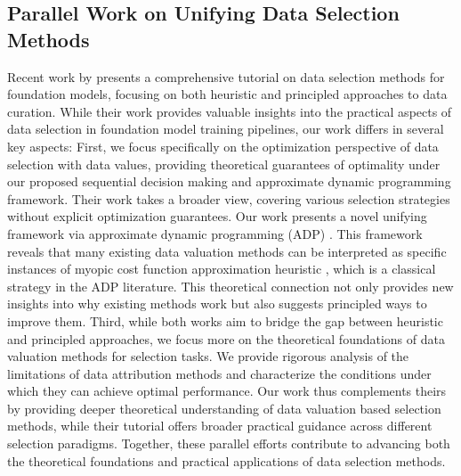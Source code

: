 \subsection{Parallel Work on Unifying Data Selection Methods}
Recent work by \citet{wang2024advancing} presents a comprehensive tutorial on data selection methods for foundation models, focusing on both heuristic and principled approaches to data curation. While their work provides valuable insights into the practical aspects of data selection in foundation model training pipelines, our work differs in several key aspects: First, we focus specifically on the optimization perspective of data selection with data values, providing theoretical guarantees of optimality under our proposed sequential decision making and approximate dynamic programming framework. Their work takes a broader view, covering various selection strategies without explicit optimization guarantees. Our work presents a novel unifying framework via approximate dynamic programming (ADP) \citep{bertsekas2024course}. This framework reveals that many existing data valuation methods can be interpreted as specific instances of myopic cost function approximation heuristic \citep{powell2016perspectives,rempel2021review}, which is a classical strategy in the ADP literature. This theoretical connection not only provides new insights into why existing methods work but also suggests principled ways to improve them. Third, while both works aim to bridge the gap between heuristic and principled approaches, we focus more on the theoretical foundations of data valuation methods for selection tasks. We provide rigorous analysis of the limitations of data attribution methods and characterize the conditions under which they can achieve optimal performance. Our work thus complements theirs by providing deeper theoretical understanding of data valuation based selection methods, while their tutorial offers broader practical guidance across different selection paradigms. Together, these parallel efforts contribute to advancing both the theoretical foundations and practical applications of data selection methods.